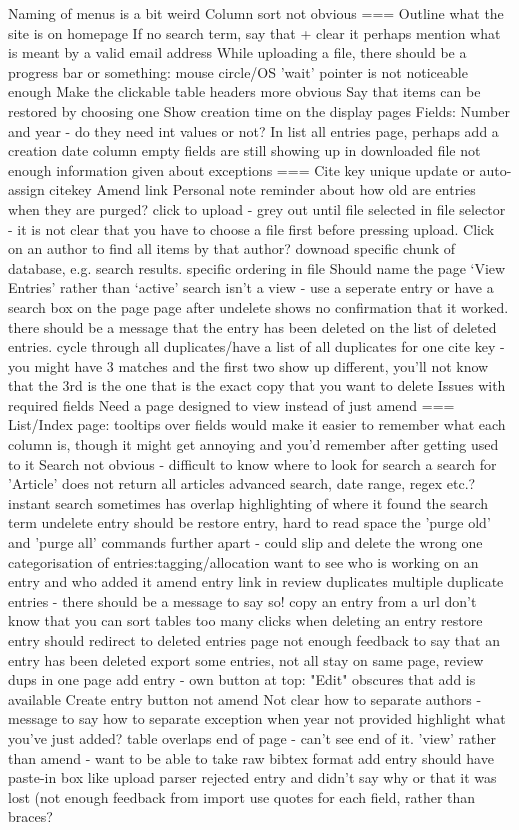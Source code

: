 Naming of menus is a bit weird
Column sort not obvious
===
Outline what the site is on homepage
If no search term, say that + clear it
perhaps mention what is meant by a valid email address
While uploading a file, there should be a progress bar or something: mouse circle/OS 'wait' pointer is not noticeable enough
Make the clickable table headers more obvious
Say that items can be restored by choosing one
Show creation time on the display pages
Fields: Number and year - do they need int values or not?
In list all entries page, perhaps add a creation date column
empty fields are still showing up in downloaded file
not enough information given about exceptions
===
Cite key unique update or auto-assign citekey
Amend link
Personal note reminder about
how old are entries when they are purged?
click to upload - grey out until file selected in file selector - it is not clear that you have to choose a file first before pressing upload.
Click on an author to find all items by that author?
downoad specific chunk of database, e.g. search results.
specific ordering in file
Should name the page `View Entries' rather than `active'
search isn't a view - use a seperate entry or have a search box on the page
page after undelete shows no confirmation that it worked.
there should be a message that the entry has been deleted on the list of deleted entries.
cycle through all duplicates/have a list of all duplicates for one cite key - you might have 3 matches and the first two show up different, you'll not know that the 3rd is the one that is the exact copy that you want to delete
Issues with required fields
Need a page designed to view instead of just amend
===
List/Index page: tooltips over fields would make it easier to remember what each column is, though it might get annoying and you'd remember after getting used to it
Search not obvious - difficult to know where to look for search
a search for 'Article' does not return all articles
advanced search, date range, regex etc.?
instant search sometimes has overlap
highlighting of where it found the search term
undelete entry should be restore entry, hard to read
space the 'purge old' and 'purge all' commands further apart - could slip and delete the wrong one
categorisation of entries:tagging/allocation
want to see who is working on an entry and who added it
amend entry link in review duplicates
multiple duplicate entries - there should be a message to say so!
copy an entry from a url
don't know that you can sort tables
too many clicks when deleting an entry
restore entry should redirect to deleted entries page
not enough feedback to say that an entry has been deleted
export some entries, not all
stay on same page, review dups in one page
add entry - own button at top: "Edit" obscures that add is available
Create entry button not amend
Not clear how to separate authors - message to say how to separate
exception when year not provided
highlight what you've just added?
table overlaps end of page - can't see end of it.
'view' rather than amend -  want to be able to take raw bibtex format
add entry should have paste-in box like upload
parser rejected entry and didn't say why or that it was lost (not enough feedback from import
use quotes for each field, rather than braces?